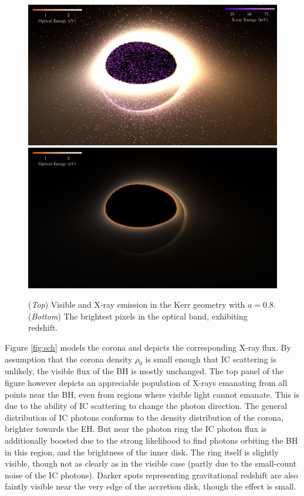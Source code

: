 \documentclass[twocolumn,twocolappendix]{aastex631}
\begin{document}
\begin{figure}
  \centering
  \includegraphics[width=\linewidth]{../imager/small/kerr-tog.pdf}
  \includegraphics[width=\linewidth]{../imager/small/kerr-bright-optical.pdf}
  \caption{(\textit{Top}) Visible and X-ray emission in the Kerr geometry with $a = 0.8$. (\textit{Bottom}) The brightest pixels in the optical band, exhibiting redshift.}
  \label{fig:kerr}
\end{figure}

Figure \ref{fig:sch} models the corona and depicts the corresponding X-ray flux. By assumption that the corona density $\rho_0$ is small enough that IC scattering is unlikely, the visible flux of the BH is mostly unchanged. The top panel of the figure however depicts an appreciable population of X-rays emanating from all points near the BH, even from regions where visible light cannot emanate. This is due to the ability of IC scattering to change the photon direction. The general distribution of IC photons conforms to the density distribution of the corona, brighter towards the EH. But near the photon ring the IC photon flux is additionally boosted due to the strong likelihood to find photons orbiting the BH in this region, and the brightness of the inner disk. The ring itself is slightly visible, though not as clearly as in the visible case (partly due to the small-count noise of the IC photons). Darker spots representing gravitational redshift are also faintly visible near the very edge of the accretion disk, though the effect is small.
\end{document}
